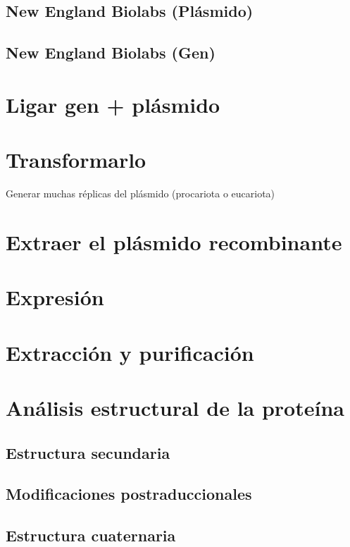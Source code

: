 \documentclass[12pt]{article}
\begin{document}
		\subsection{New England Biolabs (Pl\'asmido)}
		\subsection{New England Biolabs (Gen)}
	\section{Ligar gen + pl\'asmido}
	\section{Transformarlo}
		Generar muchas r\'eplicas del pl\'asmido (procariota o eucariota)
	\section{Extraer el pl\'asmido recombinante}
	\section{Expresi\'on}
	\section{Extracci\'on y purificaci\'on}
	\section{An\'alisis estructural de la prote\'ina}
		\subsection{Estructura secundaria}
		\subsection{Modificaciones postraduccionales}
		\subsection{Estructura cuaternaria}
	
	
%	
\end{document}
